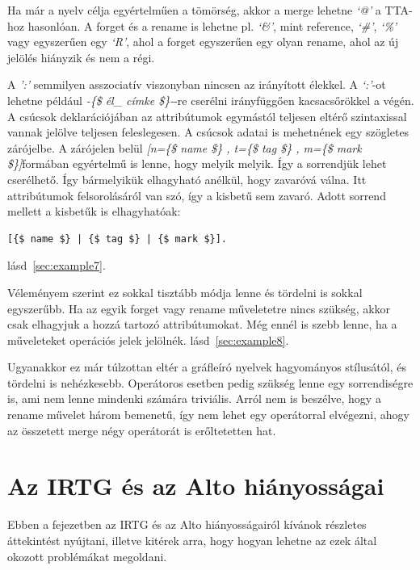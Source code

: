 Ha már a nyelv célja egyértelműen a tömörség, akkor a merge lehetne \textit{‘@’} a TTA-hoz hasonlóan. A forget és a rename is lehetne pl. \textit{‘\&’}, mint reference, \textit{‘\#’}, \textit{‘\%’} vagy egyszerűen egy \textit{‘R’}, ahol a forget egyszerűen egy olyan rename, ahol az új jelölés hiányzik és nem a régi.

A \textit{':'} semmilyen asszociatív viszonyban nincsen az irányított élekkel. A \textit{‘:’}-ot lehetne például \textit{-\{\$ él\_ címke \$\}-}-re cserélni irányfüggően kacsacsőrökkel a végén.
A csúcsok deklarációjában az attribútumok egymástól teljesen eltérő szintaxissal vannak jelölve teljesen feleslegesen. A csúcsok adatai is mehetnének egy szögletes zárójelbe. A zárójelen belül \textit{[n=\{\$ name \$\} , t=\{\$ tag \$\} , m=\{\$ mark \$\}]}formában egyértelmű is lenne, hogy melyik melyik. Így a sorrendjük lehet cserélhető. Így bármelyikük elhagyható anélkül, hogy zavaróvá válna. Itt attribútumok felsorolásáról van szó, így a kisbetű sem zavaró. Adott sorrend mellett a kisbetűk is elhagyhatóak:
\begin{verbatim}
[{$ name $} | {$ tag $} | {$ mark $}].
\end{verbatim}
 lásd~\ref{sec:example7}.

Véleményem szerint ez sokkal tisztább módja lenne és tördelni is sokkal egyszerűbb. Ha az egyik forget vagy rename műveletetre nincs szükség, akkor csak elhagyjuk a hozzá tartozó attribútumokat. Még ennél is szebb lenne, ha a műveleteket operációs jelek jelölnék. lásd~\ref{sec:example8}.

Ugyanakkor ez már túlzottan eltér a gráfleíró nyelvek hagyományos stílusától, és tördelni is nehézkesebb. Operátoros esetben pedig szükség lenne egy sorrendiségre is, ami nem lenne mindenki számára triviális. Arról nem is beszélve, hogy a rename művelet három bemenetű, így nem lehet egy operátorral elvégezni, ahogy az összetett merge négy operátorát is erőltetetten hat.


\section{Az IRTG és az Alto hiányosságai}
\label{sec:shortcomming}
Ebben a fejezetben az IRTG és az Alto hiányosságairól kívánok részletes áttekintést nyújtani, illetve kitérek arra, hogy hogyan lehetne az ezek által okozott problémákat megoldani.
